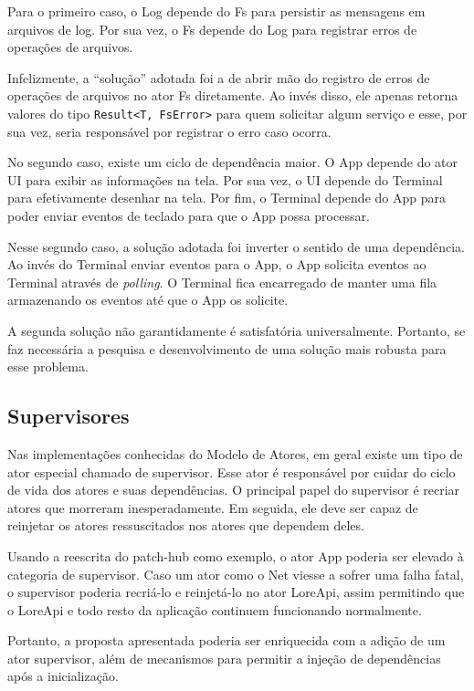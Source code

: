 Para o primeiro caso, o Log depende do Fs para persistir as mensagens em arquivos de log. Por sua vez, o Fs depende do Log para registrar erros de operações de arquivos.

Infelizmente, a ``solução'' adotada foi a de abrir mão do registro de erros de operações de arquivos no ator Fs diretamente. Ao invés disso, ele apenas retorna valores do tipo \texttt{Result<T, FsError>} para quem solicitar algum serviço e esse, por sua vez, seria responsável por registrar o erro caso ocorra.

No segundo caso, existe um ciclo de dependência maior. O App depende do ator UI para exibir as informações na tela. Por sua vez, o UI depende do Terminal para efetivamente desenhar na tela. Por fim, o Terminal depende do App para poder enviar eventos de teclado para que o App possa processar.

Nesse segundo caso, a solução adotada foi inverter o sentido de uma dependência. Ao invés do Terminal enviar eventos para o App, o App solicita eventos ao Terminal através de \emph{polling}. O Terminal fica encarregado de manter uma fila armazenando os eventos até que o App os solicite.

A segunda solução não garantidamente é satisfatória universalmente. Portanto, se faz necessária a pesquisa e desenvolvimento de uma solução mais robusta para esse problema.

\subsection{Supervisores}

Nas implementações conhecidas do Modelo de Atores, em geral existe um tipo de ator especial chamado de supervisor. Esse ator é responsável por cuidar do ciclo de vida dos atores e suas dependências. O principal papel do supervisor é recriar atores que morreram inesperadamente. Em seguida, ele deve ser capaz de reinjetar os atores ressuscitados nos atores que dependem deles.

Usando a reescrita do patch-hub como exemplo, o ator App poderia ser elevado à categoria de supervisor. Caso um ator como o Net viesse a sofrer uma falha fatal, o supervisor poderia recriá-lo e reinjetá-lo no ator LoreApi, assim permitindo que o LoreApi e todo resto da aplicação continuem funcionando normalmente.

Portanto, a proposta apresentada poderia ser enriquecida com a adição de um ator supervisor, além de mecanismos para permitir a injeção de dependências após a inicialização.

